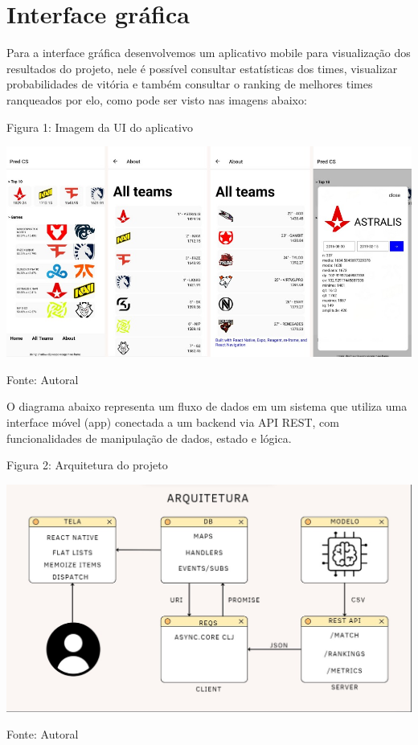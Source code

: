 \documentclass[a4paper,times,12pt]{article}
\begin{document}
\section {Interface gráfica}
\hspace{+15pt}
Para a interface gráfica desenvolvemos um aplicativo mobile para visualização dos resultados do projeto, nele é possível consultar estatísticas dos times, visualizar probabilidades de vitória e também consultar o ranking de melhores times ranqueados por elo, como pode ser visto nas imagens abaixo:

\begin{center}
  \caption{Figura 1: Imagem da UI do aplicativo}
  \centering
  \includegraphics[width=16cm]{pred_cs_final.png}
  \label{fig:predicoes_cs_final}
  \caption{Fonte: Autoral}
\end{center}

O diagrama abaixo representa um fluxo de dados em um sistema que utiliza uma interface móvel (app) conectada a um backend via API REST, com funcionalidades de manipulação de dados, estado e lógica.

\begin{center}
  \caption{Figura 2: Arquitetura do projeto}
  \centering
  \includegraphics[width=16cm]{arquitetura.png}
  \caption{Fonte: Autoral}
  \label{fig:arquitetura}
\end{center}
\end{document}
